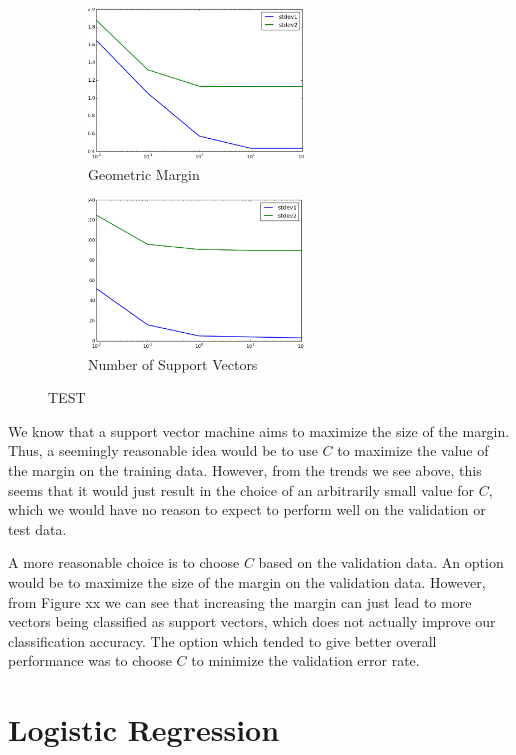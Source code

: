 \documentclass{sigchi}
\begin{document}
\begin{figure}
\centering

\begin{subfigure}[b]{2.25in}
	\includegraphics[width = 2.25in]{plots/1-3/margin.png}
	\caption{Geometric Margin}
\end{subfigure}

\begin{subfigure}[b]{2.25in}
	\includegraphics[width = 2.25in]{plots/1-3/support_vectors.png}
	\caption{Number of Support Vectors}
\end{subfigure}
\caption{TEST}
\end{figure}

We know that a support vector machine aims to maximize the size of the margin. Thus, a seemingly reasonable idea would be to use $C$ to maximize the value of the margin on the training data. However, from the trends we see above, this seems that it would just result in the choice of an arbitrarily small value for $C$, which we would have no reason to expect to perform well on the validation or test data.

A more reasonable choice is to choose $C$ based on the validation data. An option would be to maximize the size of the margin on the validation data. However, from Figure xx we can see that increasing the margin can just lead to more vectors being classified as support vectors, which does not actually improve our classification accuracy. The option which tended to give better overall performance was to choose $C$ to minimize the validation error rate.

\section{Logistic Regression}
\end{document}
